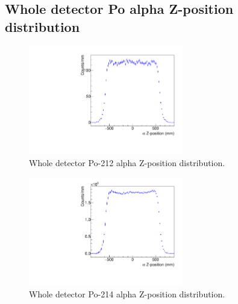\clearpage
\newpage
\subsection{Whole detector Po alpha Z-position distribution}
\begin{figure}[!h]
\centering
\includegraphics[width=0.6\textwidth]{figures/PubBiPo212Zdistribution.pdf}
\caption{\label{fig:Z212}Whole detector Po-212 alpha Z-position distribution.}
\end{figure}
\begin{figure}[!h]
\centering
\includegraphics[width=0.6\textwidth]{figures/PubBiPo214Zdistribution.pdf}
\caption{\label{fig:Z214}Whole detector Po-214 alpha Z-position distribution.}
\end{figure}
\newpage
